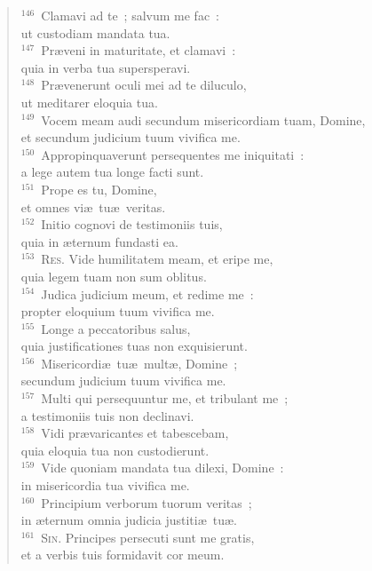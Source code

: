 \begin{verse}
${}^{146}$~Clamavi ad te~; salvum me fac~:\\ ut custodiam mandata tua.\\
${}^{147}$~Pr\ae veni in maturitate, et clamavi~:\\ quia in verba tua supersperavi.\\
${}^{148}$~Pr\ae venerunt oculi mei ad te diluculo,\\ ut meditarer eloquia tua.\\
${}^{149}$~Vocem meam audi secundum misericordiam tuam, Domine,\\ et secundum judicium tuum vivifica me.\\
${}^{150}$~Appropinquaverunt persequentes me iniquitati~:\\ a lege autem tua longe facti sunt.\\
${}^{151}$~Prope es tu, Domine,\\ et omnes vi\ae\ tu\ae\ veritas.\\
${}^{152}$~Initio cognovi de testimoniis tuis,\\ quia in \ae ternum fundasti ea.\\
${}^{153}$~\textsc{Res.} Vide humilitatem meam, et eripe me,\\ quia legem tuam non sum oblitus.\\
${}^{154}$~Judica judicium meum, et redime me~:\\ propter eloquium tuum vivifica me.\\
${}^{155}$~Longe a peccatoribus salus,\\ quia justificationes tuas non exquisierunt.\\
${}^{156}$~Misericordi\ae\ tu\ae\ mult\ae , Domine~;\\ secundum judicium tuum vivifica me.\\
${}^{157}$~Multi qui persequuntur me, et tribulant me~;\\ a testimoniis tuis non declinavi.\\
${}^{158}$~Vidi pr\ae varicantes et tabescebam,\\ quia eloquia tua non custodierunt.\\
${}^{159}$~Vide quoniam mandata tua dilexi, Domine~:\\ in misericordia tua vivifica me.\\
${}^{160}$~Principium verborum tuorum veritas~;\\ in \ae ternum omnia judicia justiti\ae\ tu\ae .\\
${}^{161}$~\textsc{Sin.} Principes persecuti sunt me gratis,\\ et a verbis tuis formidavit cor meum.\\

\end{verse}
